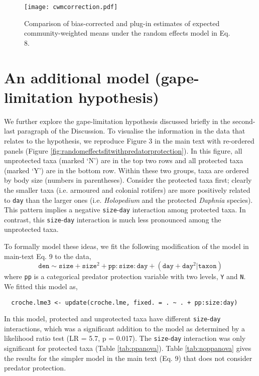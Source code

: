 \documentclass[12pt]{ecologyFORAPPENDIX}
\newcommand{\processfloatnow}{
	\begingroup
	\let\cleardoublepage\relax
	\let\clearpage\relax
	\processdelayedfloats
	\endgroup
}
\begin{document}
\begin{figure}
\texttt{[image: cwmcorrection.pdf]}
\caption{Comparison of bias-corrected and plug-in estimates of expected community-weighted means under the random effects model in Eq. 8.}
\label{fig:cwmcorrection}
\end{figure}
\processfloatnow

\section{An additional model (gape-limitation hypothesis)}

We further explore the gape-limitation hypothesis discussed briefly in the second-last paragraph of the Discussion.  To visualise the information in the data that relates to the hypothesis, we reproduce Figure 3 in the main text with re-ordered panels (Figure \ref{fig:randomeffectsfitwithpredatorprotection}).  In this figure, all unprotected taxa (marked `N') are in the top two rows and all protected taxa (marked `Y') are in the bottom row.  Within these two groups, taxa are ordered by body size (numbers in parentheses).  Consider the protected taxa first; clearly the smaller taxa (i.e. armoured and colonial rotifers) are more positively related to \texttt{day} than the larger ones (i.e. \emph{Holopedium} and the protected \emph{Daphnia} species).  This pattern implies a negative \texttt{size}-\texttt{day} interaction among protected taxa.  In contrast, this \texttt{size}-\texttt{day} interaction is much less pronounced among the unprotected taxa.

To formally model these ideas, we fit the following modification of the model in main-text Eq. 9 to the data,
\begin{equation}
\mathtt{den} \sim \mathtt{size} + \mathtt{size}^2 + \mathtt{pp}:\mathtt{size}:\mathtt{day} + (\mathtt{day} + \mathtt{day}^2 | \mathtt{taxon})
\label{eq:fdminteraction}
\end{equation}
where \texttt{pp} is a categorical predator protection variable with two levels, \texttt{Y} and \texttt{N}.  We fitted this model as,
\begin{verbatim} 
  croche.lme3 <- update(croche.lme, fixed. = . ~ . + pp:size:day) 
\end{verbatim} 
In this model, protected and unprotected taxa have different \texttt{size}-\texttt{day} interactions, which was a significant addition to the model as determined by a likelihood ratio test (LR = 5.7, p = 0.017).  The \texttt{size}-\texttt{day} interaction was only significant for protected taxa (Table \ref{tab:ppanova}).  Table \ref{tab:noppanova} gives the results for the simpler model in the main text (Eq. 9) that does not consider predator protection.
\end{document}
